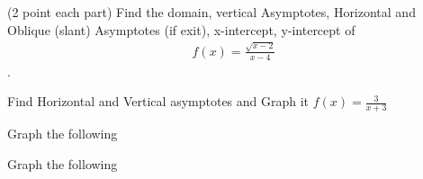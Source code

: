 \documentclass[11pt]{exam}
\begin{document}
\begin{questions}
\newpage
\vspace{8cm}
\addpoints
\question[10] (2 point each part) Find the domain, vertical Asymptotes, Horizontal and Oblique (slant) Asymptotes (if exit), x-intercept, y-intercept of   
\begin{align*}
f(x)=\frac{\sqrt{x-2}}{x-4}
\end{align*}.

\vspace{8cm}
\addpoints
\question[10] Find Horizontal and Vertical asymptotes and Graph it $f(x)=\frac{3}{x+3}$

\newpage
\addpoints
\question[10] Graph the following

\noaddpoints %
\addpoints
\question[10] Graph the following
\begin{parts}

\end{parts}
\end{questions}
\end{document}
